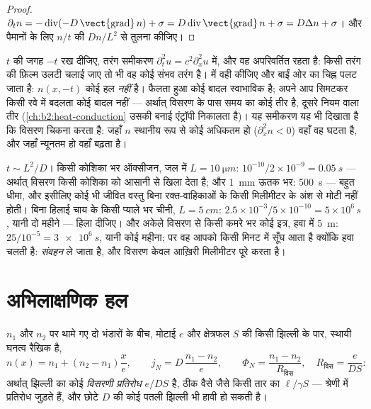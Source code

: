 \begin{proof}
$\partial_t n = -\operatorname{div}(-D\,\vect{\operatorname{grad}}\,n) +
\sigma = D\operatorname{div}\vect{\operatorname{grad}}\,n + \sigma = D\Delta
n + \sigma$। और पैमानों के लिए $n/t$ की $Dn/L^2$ से तुलना कीजिए।
\end{proof}

\begin{remark}\label{rem:b2:particle-diffusion:irreversible}
$t$ की जगह $-t$ रख दीजिए, तरंग समीकरण $\partial_t^2 u = c^2
\partial_x^2 u$ में, और वह अपरिवर्तित रहता है: किसी तरंग की
फ़िल्म उलटी चलाई जाए तो भी वह कोई संभव तरंग है।  में वही कीजिए और बाईं
ओर का चिह्न पलट जाता है: $n(x,-t)$ कोई हल \emph{नहीं} है। फैलता हुआ कोई बादल
स्वाभाविक है; अपने आप सिमटकर किसी रवे में बदलता कोई बादल
नहीं --- अर्थात् विसरण के पास समय का कोई तीर है, दूसरे नियम वाला तीर
(\cref{ch:b2:heat-conduction} उसकी बनाई एंट्रॉपी निकालता है)। यह
समीकरण यह भी दिखाता है कि विसरण चिकना करता है: जहाँ $n$ स्थानीय रूप से कोई
अधिकतम हो ($\partial_x^2 n < 0$) वहाँ वह घटता है, और जहाँ न्यूनतम हो वहाँ
बढ़ता है।
\end{remark}

\begin{example}\label{ex:b2:particle-diffusion:times}
$t \sim L^2/D$। किसी कोशिका भर ऑक्सीजन, जल में $L = \qty{10}{\micro m}$:
$10^{-10}/2 \times 10^{-9} = \qty{0.05}{s}$ --- अर्थात् विसरण किसी कोशिका को
आसानी से खिला देता है; और \qty{1}{mm} ऊतक भर: \qty{500}{s} --- बहुत धीमा, और इसीलिए
कोई भी जीवित वस्तु बिना रक्त-वाहिकाओं के किसी मिलीमीटर के अंश से मोटी
नहीं होती। बिना हिलाई चाय के किसी प्याले भर चीनी, $L = \qty{5}{cm}$:
$2.5 \times 10^{-3}/5 \times 10^{-10} = 5 \times 10^6\,\unit{s}$, यानी दो महीने
--- हिला दीजिए। और अकेले विसरण से किसी कमरे भर कोई इत्र, हवा में \qty{5}{m}:
$25/10^{-5} = \qty{3e6}{s}$, यानी कोई महीना; पर वह आपको किसी मिनट में सूँघ आता है
क्योंकि हवा चलती है: \emph{संवहन} ले जाता है, और विसरण केवल
आख़िरी मिलीमीटर पूरे करता है।
\end{example}

\section{अभिलाक्षणिक हल}

\begin{proposition}[स्थायी दशा: झिल्ली]\label{prop:b2:particle-diffusion:membrane}
$n_1$ और $n_2$ पर थामे गए दो भंडारों के बीच, मोटाई $e$ और क्षेत्रफल $S$
की किसी झिल्ली के पार, स्थायी घनत्व रैखिक है,
\[
n(x) = n_1 + (n_2 - n_1)\frac{x}{e}, \qquad
j_N = D\,\frac{n_1 - n_2}{e}, \qquad
\Phi_N = \frac{n_1 - n_2}{R_{\text{विस}}}, \quad R_{\text{विस}} = \frac{e}{DS}:
\]
अर्थात् झिल्ली का कोई \emph{विसरणी प्रतिरोध} $e/DS$ है, ठीक वैसे जैसे किसी तार का
$\ell/\gamma S$ --- श्रेणी में प्रतिरोध जुड़ते हैं, और छोटे $D$ की कोई पतली झिल्ली
भी हावी हो सकती है।
\end{proposition}

